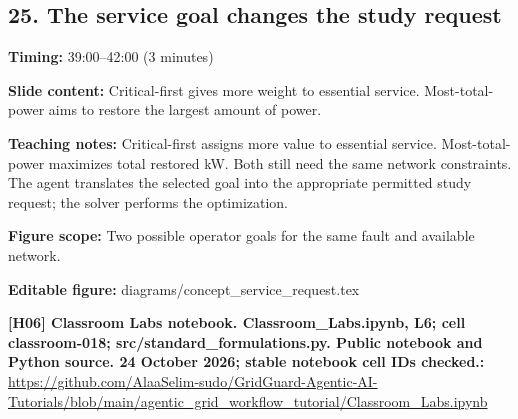 \documentclass[10pt,letterpaper]{article}
\begin{document}
\subsection*{25. The service goal changes the study request}
\textbf{Timing:} 39:00--42:00 (3 minutes)\par
\textbf{Slide content:} Critical-first gives more weight to essential service.
Most-total-power aims to restore the largest amount of power.\par
\textbf{Teaching notes:} Critical-first assigns more value to essential service. Most-total-power maximizes total restored kW. Both still need the same network constraints. The agent translates the selected goal into the appropriate permitted study request; the solver performs the optimization.\par
\textbf{Figure scope:} Two possible operator goals for the same fault and available network.\par
\textbf{Editable figure:} diagrams/concept\_service\_request.tex\par
\textbf{[H06] Classroom Labs notebook. Classroom\_Labs.ipynb, L6; cell classroom-018; src/standard\_formulations.py. Public notebook and Python source. 24 October 2026; stable notebook cell IDs checked.:} \href{https://github.com/AlaaSelim-sudo/GridGuard-Agentic-AI-Tutorials/blob/main/agentic_grid_workflow_tutorial/Classroom_Labs.ipynb}{\small\ttfamily https:/\allowbreak{}/\allowbreak{}github.\allowbreak{}com/\allowbreak{}AlaaSelim-\allowbreak{}sudo/\allowbreak{}GridGuard-\allowbreak{}Agentic-\allowbreak{}AI-\allowbreak{}Tutorials/\allowbreak{}blob/\allowbreak{}main/\allowbreak{}agentic\_\allowbreak{}grid\_\allowbreak{}workflow\_\allowbreak{}tutorial/\allowbreak{}Classroom\_\allowbreak{}Labs.\allowbreak{}ipynb}\par
\par\medskip
\end{document}
